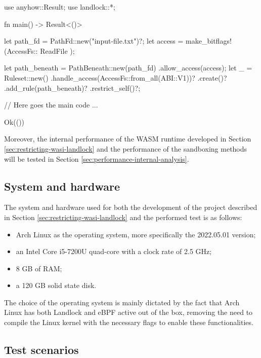 \vspace*{0.5cm}
\begin{code}[language=Rust, caption=An example of a program restricted with Landlock., label=lst:test-program-landlock-example]
use anyhow::Result;
use landlock::*;

fn main() -> Result<()> {
    let path_fd = PathFd::new("input-file.txt")?;
    let access = make_bitflags!(AccessFs::{ ReadFile });
    
    let path_beneath = PathBeneath::new(path_fd)
      .allow_access(access);
    let _ = Ruleset::new()
        .handle_access(AccessFs::from_all(ABI::V1))?
        .create()?
        .add_rule(path_beneath)?
        .restrict_self()?;

    // Here goes the main code ...

    Ok(())
}
\end{code}

Moreover, the internal performance of the WASM runtime developed in Section \ref{sec:restricting-wasi-landlock}
and the performance of the sandboxing methods will be tested in Section \ref{sec:performance-internal-analysis}.

\subsection{System and hardware}

The system and hardware used for both the development of the project described in Section \ref{sec:restricting-wasi-landlock}
and the performed test is as follows:
\begin{itemize}
  \item Arch Linux \cite{arch-linux} as the operating system, more specifically the 2022.05.01 version;
  \item an Intel Core i5-7200U quad-core with a clock rate of 2.5 GHz;
  \item 8 GB of RAM;
  \item a 120 GB solid state disk.
\end{itemize}

The choice of the operating system is mainly dictated by the fact that Arch Linux has both Landlock and eBPF active
out of the box, removing the need to compile the Linux kernel with the necessary flags to enable these
functionalities.

\subsection{Test scenarios}
\label{sec:performance-test-description}


